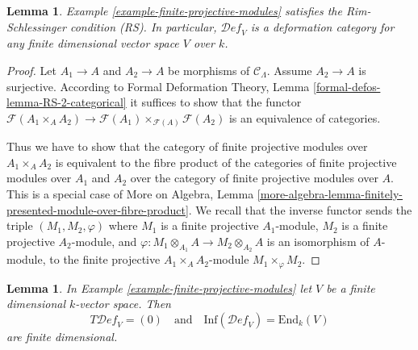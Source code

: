 \documentclass{stacks-project}
\theoremstyle{plain}
\newtheorem{lemma}[subsection]{Lemma}
\theoremstyle{definition}
\theoremstyle{remark}
\numberwithin{equation}{subsection}
\def\Deformationcategory{\mathcal{D}\!\mathit{ef}}
\begin{document}
\begin{lemma}
\label{lemma-finite-projective-modules-RS}
Example \ref{example-finite-projective-modules}
satisfies the Rim-Schlessinger condition (RS).
In particular, $\Deformationcategory_V$ is a deformation category
for any finite dimensional vector space $V$ over $k$.
\end{lemma}

\begin{proof}
Let $A_1 \to A$ and $A_2 \to A$ be morphisms of $\mathcal{C}_\Lambda$.
Assume $A_2 \to A$ is surjective. According to
Formal Deformation Theory, Lemma
\ref{formal-defos-lemma-RS-2-categorical}
it suffices to show that the functor
$\mathcal{F}(A_1 \times_A A_2) \to
\mathcal{F}(A_1) \times_{\mathcal{F}(A)} \mathcal{F}(A_2)$
is an equivalence of categories.

\medskip\noindent
Thus we have to show that the category of finite projective modules
over $A_1 \times_A A_2$ is equivalent to the fibre product
of the categories of finite projective modules over $A_1$ and $A_2$
over the category of finite projective modules over $A$.
This is a special case of More on Algebra, Lemma
\ref{more-algebra-lemma-finitely-presented-module-over-fibre-product}.
We recall that the inverse functor sends the triple
$(M_1, M_2, \varphi)$ where
$M_1$ is a finite projective $A_1$-module,
$M_2$ is a finite projective $A_2$-module, and
$\varphi : M_1 \otimes_{A_1} A \to M_2 \otimes_{A_2} A$
is an isomorphism of $A$-module, to the finite projective
$A_1 \times_A A_2$-module $M_1 \times_\varphi M_2$.
\end{proof}

\begin{lemma}
\label{lemma-finite-projective-modules-TI}
In Example \ref{example-finite-projective-modules}
let $V$ be a finite dimensional $k$-vector space. Then
$$
T\Deformationcategory_V = (0)
\quad\text{and}\quad
\text{Inf}(\Deformationcategory_V) = \text{End}_k(V)
$$
are finite dimensional.
\end{lemma}
\end{document}

